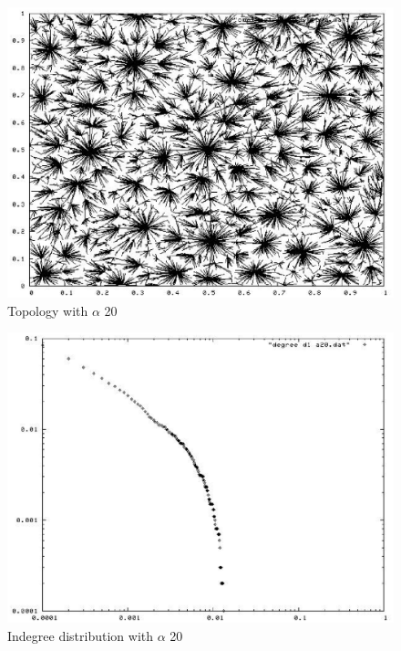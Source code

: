 \documentclass[a4paper,12pt]{article}
\begin{document}
\begin{figure}
\begin{center}
\includegraphics[scale=0.6]{pic_alfa20.eps}
\end{center}
\caption{Topology with $\alpha$ 20\label{t20figure}}
\end{figure}

\begin{figure}
\begin{center}
\includegraphics[scale=0.6]{picdegree_alfa20.eps}
\end{center}
\caption{Indegree distribution with $\alpha$ 20 \label{d20figure}}
\end{figure}
\end{document}
